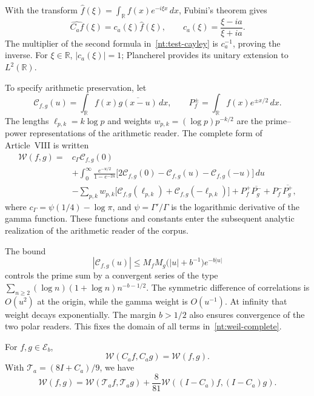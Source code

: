 With the transform
\(\widehat f(\xi)=\int_{\mathbb R}f(x)e^{-i\xi x}\,dx\),
Fubini's theorem gives
\begin{equation}
 \widehat{C_af}(\xi)
 =c_a(\xi)\widehat f(\xi),\qquad
 c_a(\xi)=\frac{\xi-ia}{\xi+ia}.
 \label{nt:cayley-multiplier}
\end{equation}
The multiplier of the second formula
in~\eqref{nt:test-cayley} is \(c_a^{-1}\), proving
the inverse. For \(\xi\in\mathbb R\),
\(|c_a(\xi)|=1\); Plancherel provides its unitary
extension to \(L^2(\mathbb R)\).

To specify arithmetic preservation, let
\[
 \mathcal C_{f,g}(u)
 =\int_{\mathbb R}f(x)\overline{g(x-u)}\,dx,
 \qquad
 P_f^\pm=\int_{\mathbb R}f(x)e^{\pm x/2}\,dx.
\]
The lengths \(\ell_{p,k}=k\log p\) and weights
\(w_{p,k}=(\log p)p^{-k/2}\) are the prime--power
representations of the arithmetic reader. The complete form
of Article~VIII is written
\begin{equation}
 \begin{split}
 \mathscr W(f,g)={}&c_\Gamma\mathcal C_{f,g}(0)\\
 &+\int_0^\infty\frac{e^{-u/2}}{1-e^{-2u}}
 \bigl[2\mathcal C_{f,g}(0)
       -\mathcal C_{f,g}(u)-\mathcal C_{f,g}(-u)\bigr]\,du\\
 &-\sum_{p,k}w_{p,k}
   \bigl[\mathcal C_{f,g}(\ell_{p,k})
        +\mathcal C_{f,g}(-\ell_{p,k})\bigr]
 +P_f^+\overline{P_g^-}+P_f^-\overline{P_g^+},
 \end{split}
 \label{nt:weil-complete}
\end{equation}
where \(c_\Gamma=\psi(1/4)-\log\pi\), and
\(\psi=\Gamma'/\Gamma\) is the logarithmic derivative of the
gamma function. These functions and constants enter
the subsequent analytic realization of the arithmetic
reader of the corpus.

The bound
\[
 |\mathcal C_{f,g}(u)|
 \leq M_fM_g\bigl(|u|+b^{-1}\bigr)e^{-b|u|}
\]
controls the prime sum by a convergent series of the type
\(\sum_{n\geq2}(\log n)(1+\log n)n^{-b-1/2}\).
The symmetric difference of correlations is \(O(u^2)\)
at the origin, while the gamma weight is \(O(u^{-1})\).
At infinity that weight decays exponentially.
The margin \(b>1/2\) also ensures convergence of
the two polar readers. This fixes the domain
of all terms in~\eqref{nt:weil-complete}.

\begin{proposition}
For \(f,g\in\mathscr E_b\),
\begin{equation}
 \mathscr W(C_af,C_ag)=\mathscr W(f,g).
 \label{nt:weil-invariance}
\end{equation}
With \(\mathcal T_a=(8I+C_a)/9\), we have
\begin{equation}
 \mathscr W(f,g)
 =\mathscr W(\mathcal T_af,\mathcal T_ag)
 +\frac8{81}\mathscr W((I-C_a)f,(I-C_a)g).
 \label{nt:weil-balance}
\end{equation}
\end{proposition}


